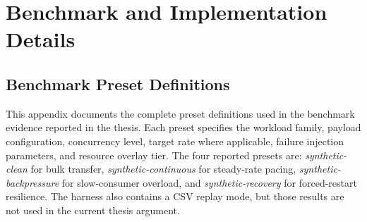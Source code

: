 \chapter{Benchmark and Implementation Details}\label{ch:appendix}

\section{Benchmark Preset Definitions}
\label{app:presets}

This appendix documents the complete preset definitions used in the benchmark evidence reported in the thesis. Each preset specifies the workload family, payload configuration, concurrency level, target rate where applicable, failure injection parameters, and resource overlay tier. The four reported presets are: \emph{synthetic-clean} for bulk transfer, \emph{synthetic-continuous} for steady-rate pacing, \emph{synthetic-backpressure} for slow-consumer overload, and \emph{synthetic-recovery} for forced-restart resilience. The harness also contains a CSV replay mode, but those results are not used in the current thesis argument.

\begin{table}[!htbp]
    \centering
    \scriptsize
    \caption{Benchmark presets used in the current transport study.}
    \label{tab:appendix-presets}
    \setlength{\tabcolsep}{3pt}
\end{table}

